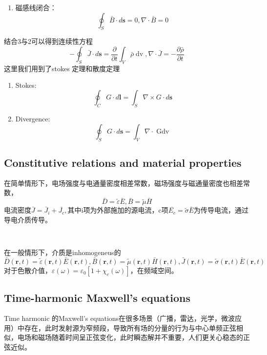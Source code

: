 \documentclass{article}
\newcommand{\tmmathbf}[1]{\ensuremath{\boldsymbol{#1}}}
\newcommand{\tmop}[1]{\ensuremath{\operatorname{#1}}}
\begin{document}
\begin{CJK*}{UTF8}{gbsn}
\begin{enumerate}
  \item 磁感线闭合：
  \[ \oint_S \bar{B} \cdot d\tmmathbf{s}= 0, \nabla \cdot \bar{B} = 0 \]
\end{enumerate}
结合3与2可以得到连续性方程
\[ - \oint_S \bar{J} \cdot d\tmmathbf{s}= \frac{\partial}{\partial t} \int_V
   \bar{\rho} \tmop{dv}, \nabla \cdot \bar{J} = - \frac{\partial
   \bar{\rho}}{\partial t} \]
这里我们用到了stokes 定理和散度定理
\begin{enumerate}
  \item Stokes:
  \[ \oint_C G \cdot d\tmmathbf{l}= \int_S \nabla \times G \cdot d\tmmathbf{s}
  \]
  \item Divergence:
  \[ \oint_S G \cdot d\tmmathbf{s}= \int_V \nabla \cdot \tmop{Gdv} \]
\end{enumerate}


\subsection{Constitutive relations and material properties}

在简单情形下，电场强度与电通量密度相差常数，磁场强度与磁通量密度也相差常数，
\[ \bar{D} = \tilde{\varepsilon} \bar{E}, \bar{B} = \tilde{\mu} \bar{H} \]
电流密度$\bar{J} = \bar{J}_i +
\overline{J_c},$其中i项为外部施加的源电流，c项$\overline{E_c} =
\tilde{\sigma} \bar{E}$为传导电流，通过导电介质传导。

\

在一般情形下，介质是inhomogeneus的
\[ \bar{D} (\tmmathbf{r}, t) = \tilde{\varepsilon} (\tmmathbf{r}, t) \bar{E}
   (\tmmathbf{r}, t), \bar{B} (\tmmathbf{r}, t) = \tilde{\mu} (\tmmathbf{r},
   t) \bar{H} (\tmmathbf{r}, t), \bar{J} (\tmmathbf{r}, t) = \tilde{\sigma}
   (\tmmathbf{r}, t) \bar{E} (\tmmathbf{r}, t) \]
对于色散介值，$\varepsilon (\omega) = \varepsilon_0 [1 + \chi_e
(\omega)]$，在频域空间。

\subsection{Time-harmonic Maxwell's equations}

Time harmonic 的Maxwell's
equations在很多场景（广播，雷达，光学，微波应用）中存在，此时发射源为窄频段，导致所有场的分量的行为与中心单频正弦相似，电场和磁场随着时间呈正弦变化，此时瞬态解并不重要，人们更关心稳态的正弦近似。


\end{CJK*}
\end{document}
